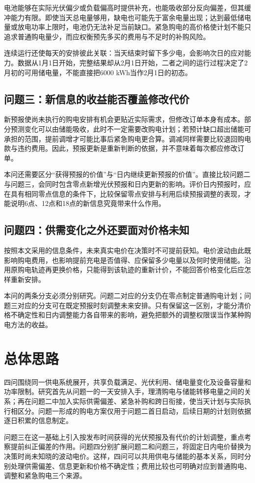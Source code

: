 电池能够在实际光伏偏少或负载偏高时提供补充，也能吸收部分反向偏差，但其缓冲能力有限。即使当天总电量够用，缺电也可能先于富余电量出现；达到最低储电量或放电功率上限时，电池仍无法补足当前缺口。紧急购电的高价格使计划不能只追求普通购电量少，而应权衡预先多买的费用与不足时的补购风险。

连续运行还使每天的安排彼此关联：当天结束时留下多少电，会影响次日的应对能力。数据从1月1日开始，完整结果却从2月1日开始，二者之间的运行过程决定了2月初的可用储电量，不能直接把6000 kWh当作2月1日的初态。


\subsection{问题三：新信息的收益能否覆盖修改代价}
新预报使尚未执行的购电安排有机会更贴近实际需求，但修改订单本身有成本。部分预测变化可以由储能吸收，此时不一定需要改购电计划；若预计缺口超出储能可承担的范围，提前调增才可能比事后紧急购电更合算。调减同样需要比较退回购电款与违约费用。因此，预报更新是重新判断的依据，并不意味着每次都应修改订单。

本问还需要区分“获得预报的价值”与“日内继续更新预报的价值”。直接比较问题二与问题三，会同时包含零点新增光伏预报和日内更新的影响。评价日内预报时，应在具有相同零点信息的条件下，比较保留零点安排与利用后续预报调整的表现，才能说明6点、12点和18点的新信息究竟带来什么作用。

\subsection{问题四：供需变化之外还要面对价格未知}
按照本文采用的信息条件，未来真实电价在决策时不可提前获知。电价波动由此既影响购电费用，也影响提前充电是否值得、应保留多少电量以及何时使用储能。沿用原购电轨迹再更换价格，只能得到该轨迹的重新计价，不能回答价格变化后应怎样重新安排。

本问的两条分支必须分别研究。问题二对应的分支仍在零点制定普通购电计划；问题三对应的分支可在既定预报时刻调整未来安排。只有保留这一区别，才能分清价格不确定性和日内调整能力各自带来的影响，避免把额外的调整权限误当作某种购电方法的收益。

\section{总体思路}
四问围绕同一供电系统展开，共享负载满足、光伏利用、储电量变化及设备容量和功率限制。研究首先从问题一的一天安排入手，理清购电与储能转移电量之间的关系；再在问题二中加入实际供需偏差、紧急补购和跨日衔接，使当天计划与实际执行相区分。问题一形成的购电方案仅用于问题二首日启动，后续日期的计划则依据逐日积累的信息制定。

问题三在这一基础上引入按发布时间获得的光伏预报及有代价的计划调整，重点考察提前纠正偏差的作用。问题四分别扩展问题二和问题三，将固定日内电价替换为决策时尚未知晓的波动电价。这样，四问可以共用供电与储能的基本关系，同时分别处理供需偏差、信息更新和价格不确定性；费用比较也可明确对应到普通购电、调整和紧急购电三个来源。
